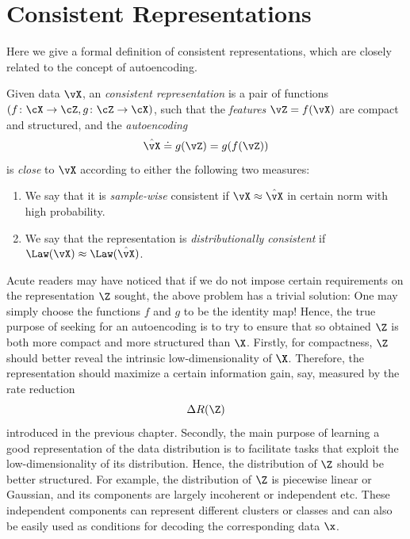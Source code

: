 \documentclass[../../book-main.tex]{subfiles}
\begin{document}
\section{Consistent Representations}\label{sec:consistent-representation}

Here we give a formal definition of consistent representations, which
are closely related to the concept of autoencoding. %
\begin{definition}\label{def:bidirectional_rep}
  Given data \(\vX\), an \textit{consistent representation} is a pair
  of functions \((f \colon \cX \to \cZ, g \colon \cZ \to \cX)\), such
  that the \textit{features} \(\vZ = f(\vX)\) are compact and
  structured, and the \textit{autoencoding} \[\hat{\vX} \doteq g(\vZ)
  = g(f(\vZ))\] is \textit{close} to \(\vX\) according to either the
  following two measures:
  \begin{enumerate}
    \item We say that it is \textit{sample-wise} consistent if \(\vX
      \approx \hat{\vX}\) in certain norm with high probability.
    \item We say that the representation is \textit{distributionally
      consistent} if \(\Law(\vX) \approx \Law(\hat{\vX})\).
  \end{enumerate}
\end{definition}

Acute readers may have noticed that if we do not impose certain
requirements on the representation $\Z$ sought, the above problem has
a trivial solution: One may simply choose the functions $f$ and $g$
to be the identity map! Hence, the true purpose of seeking for an
autoencoding is to try to ensure that so obtained $\Z$ is both more
compact and more structured than $\X$. Firstly, for compactness, $\Z$
should better reveal the intrinsic low-dimensionality of $\X$.
Therefore, the representation should maximize a certain information
gain, say, measured by the rate reduction
\begin{equation}
  \Delta R(\Z)
\end{equation}
introduced in the previous chapter. Secondly, the main purpose of
learning a good representation of the data distribution is to
facilitate tasks that exploit the low-dimensionality of its
distribution. Hence, the distribution of $\Z$ should be better
structured. For example, the distribution of $\Z$ is piecewise linear
or Gaussian, and its components are largely incoherent or independent
etc. These independent components can represent different clusters or
classes and can also be easily used as conditions for decoding the
corresponding data $\x$.
\end{document}
